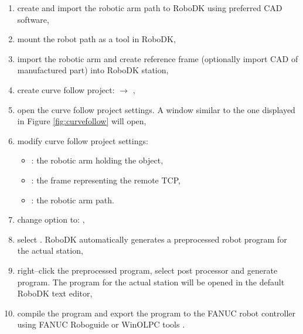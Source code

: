\begin{enumerate}

\item create and import the robotic arm path to RoboDK using preferred CAD software,

\item mount the robot path as a tool in RoboDK,

\item import the robotic arm and create reference frame (optionally import CAD of manufactured part) into RoboDK station, 

\item create curve follow project:  $\rightarrow$ ,

\item open the curve follow project settings. A window similar to the one displayed in Figure \ref{fig:curvefollow} will open, 

\item modify curve follow project settings:

    \begin{itemize}

        \item {}: the robotic arm holding the object,
        \item {}: the frame representing the remote TCP,
        \item {}: the robotic arm path.
        
    \end{itemize}
    
\item change  option to: ,

\item select . RoboDK automatically generates a preprocessed robot program for the actual station,

\item right--click the preprocessed program, select post processor and generate program. The  program for the actual station will be opened in the default RoboDK text editor,

\item compile the program and export the program to the FANUC robot controller using FANUC Roboguide or WinOLPC tools \cite{curvefollow}.
    
\end{enumerate}

